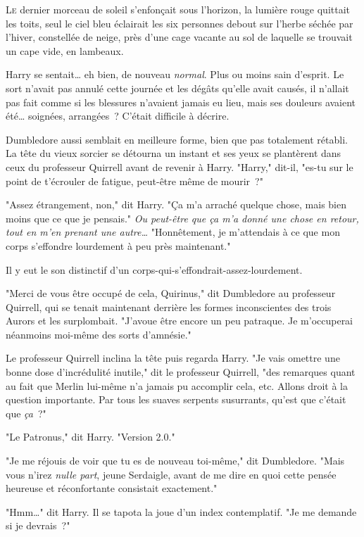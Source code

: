 
\lettrine{L}{e} dernier morceau de soleil s'enfonçait sous l'horizon, la lumière rouge quittait les toits, seul le ciel bleu éclairait les six personnes debout sur l'herbe séchée par l'hiver, constellée de neige, près d'une cage vacante au sol de laquelle se trouvait un cape vide, en lambeaux.

Harry se sentait… eh bien, de nouveau \emph{normal}. Plus ou moins sain d'esprit. Le sort n'avait pas annulé cette journée et les dégâts qu'elle avait causés, il n'allait pas fait comme si les blessures n'avaient jamais eu lieu, mais ses douleurs avaient été… soignées, arrangées~? C'était difficile à décrire.

Dumbledore aussi semblait en meilleure forme, bien que pas totalement rétabli. La tête du vieux sorcier se détourna un instant et ses yeux se plantèrent dans ceux du professeur Quirrell avant de revenir à Harry. "Harry," dit-il, "es-tu sur le point de t'écrouler de fatigue, peut-être même de mourir~?"

"Assez étrangement, non," dit Harry. "Ça m'a arraché quelque chose, mais bien moins que ce que je pensais." \emph{Ou peut-être que ça m'a donné une chose en retour, tout en m'en prenant une autre…} "Honnêtement, je m'attendais à ce que mon corps s'effondre lourdement à peu près maintenant."

Il y eut le son distinctif d'un corps-qui-s'effondrait-assez-lourdement.

"Merci de vous être occupé de cela, Quirinus," dit Dumbledore au professeur Quirrell, qui se tenait maintenant derrière les formes inconscientes des trois Aurors et les surplombait. "J'avoue être encore un peu patraque. Je m'occuperai néanmoins moi-même des sorts d'amnésie."

Le professeur Quirrell inclina la tête puis regarda Harry. "Je vais omettre une bonne dose d'incrédulité inutile," dit le professeur Quirrell, "des remarques quant au fait que Merlin lui-même n'a jamais pu accomplir cela, etc. Allons droit à la question importante. Par tous les suaves serpents susurrants, qu'est que c'était que \emph{ça}~?"

"Le Patronus," dit Harry. "Version 2.0."

"Je me réjouis de voir que tu es de nouveau toi-même," dit Dumbledore. "Mais vous n'irez \emph{nulle part}, jeune Serdaigle, avant de me dire en quoi cette pensée heureuse et réconfortante consistait exactement."

"Hmm…" dit Harry. Il se tapota la joue d'un index contemplatif. "Je me demande si je devrais~?"

